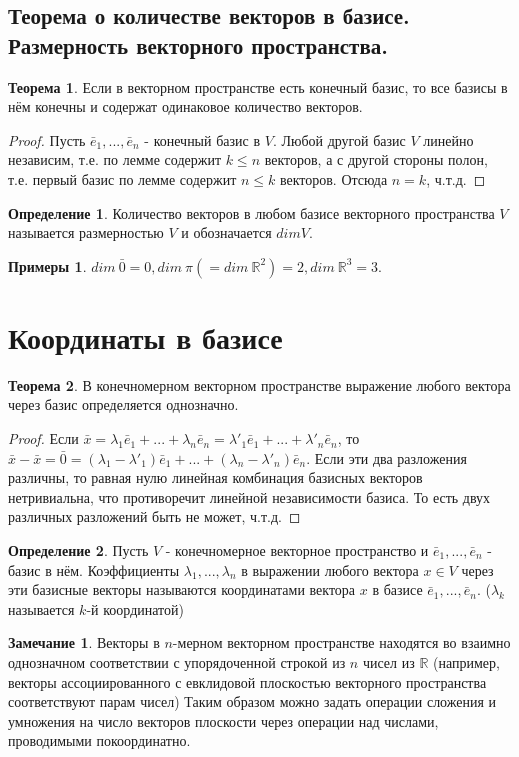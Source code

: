 \documentclass[a4paper, 12pt]{article}
\theoremstyle{definition}
\newtheorem*{definition}{Определение}
\newtheorem*{theorem}{Теорема}
\newtheorem*{remark}{Замечание}
\newtheorem*{examples}{Примеры}
\begin{document}
	\subsection{Теорема о количестве векторов в базисе. Размерность векторного пространства.}
	\begin{theorem}
		Если в векторном пространстве есть конечный базис, то все базисы в нём конечны и содержат одинаковое количество векторов.
	\end{theorem}
	\begin{proof}
		Пусть $\bar{e}_{1},...,\bar{e}_{n}$ - конечный базис в $V$. Любой другой базис $V$ линейно независим, т.е. по лемме содержит $k \leqslant n$ векторов, а с другой стороны полон, т.е. первый базис по лемме содержит $n \leqslant k$ векторов. Отсюда $n=k$, ч.т.д.
	\end{proof}
	\begin{definition}
		Количество векторов в любом базисе векторного пространства $V$ называется размерностью $V$ и обозначается $dim V$.
	\end{definition}
	\begin{examples}
		$dim \ {\bar{0}} = 0, dim \ \pi (= dim \ \mathbb{R}^2) = 2, dim \ \mathbb{R}^3 = 3$.
	\end{examples}
	\section{Координаты в базисе}
	\begin{theorem}
		В конечномерном векторном пространстве выражение любого вектора через базис определяется однозначно.
	\end{theorem}
	\begin{proof}
		Если $\bar{x} = \lambda_{1}\bar{e}_{1} + ... + \lambda_{n}\bar{e}_{n} = \lambda'_{1}\bar{e}_{1} + ... + \lambda'_{n}\bar{e}_{n}$, то $\bar{x} - \bar{x} = \bar{0} = (\lambda_{1} - \lambda'_{1})\bar{e}_{1} + ... + (\lambda_{n} - \lambda'_n)\bar{e}_{n}$. Если эти два разложения различны, то равная нулю линейная комбинация базисных векторов нетривиальна, что противоречит линейной независимости базиса. То есть двух различных разложений быть не может, ч.т.д. 
	\end{proof}
	\begin{definition}
		Пусть $V$ - конечномерное векторное пространство и $\bar{e}_{1},...,\bar{e}_{n}$ - базис в нём. Коэффициенты $\lambda_{1},...,\lambda_{n}$ в выражении любого вектора $x \in V$ через эти базисные векторы называются координатами вектора $x$ в базисе $\bar{e}_{1},...,\bar{e}_{n}$. ($\lambda_{k}$  называется $k$-й координатой)
	\end{definition}
	\begin{remark}
		Векторы в $n$-мерном векторном пространстве находятся во взаимно однозначном соответствии с упорядоченной строкой из $n$ чисел из $\mathbb{R}$ (например, векторы ассоциированного с евклидовой плоскостью векторного пространства соответствуют парам чисел)
		Таким образом можно задать операции сложения и умножения на число векторов плоскости через операции над числами, проводимыми покоординатно.
	\end{remark}
\end{document}
